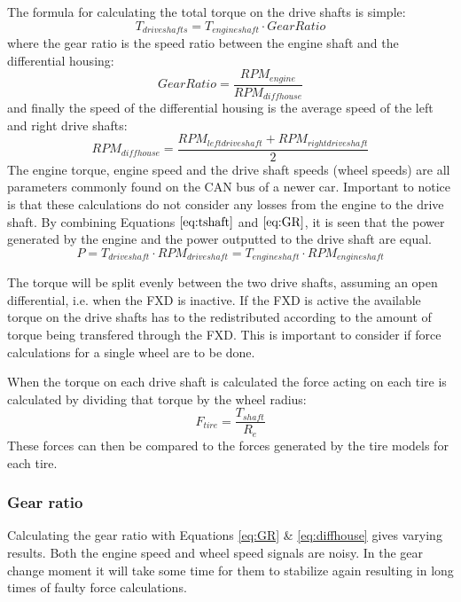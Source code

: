 The formula for calculating the total torque on the drive shafts is simple:
\begin{equation}
\label{eq:tshaft}
T_{driveshafts} = T_{engineshaft}\cdot GearRatio
\end{equation}
where the gear ratio is the speed ratio between the engine shaft and the differential housing:
\begin{equation}
\label{eq:GR}
Gear Ratio = \frac{RPM_{engine}}{RPM_{diffhouse}}
\end{equation}
and finally the speed of the differential housing is the average speed of the left and right drive shafts:
\begin{equation}
\label{eq:diffhouse}
RPM_{diffhouse} = \frac{RPM_{leftdriveshaft}+RPM_{rightdriveshaft}}{2}
\end{equation}
The engine torque, engine speed and the drive shaft speeds (wheel speeds) are all parameters commonly found on the CAN bus of a newer car. Important to notice is that these calculations do not consider any losses from the engine to the drive shaft. By combining Equations $ \ref{eq:tshaft} $ and $ \ref{eq:GR} $, it is seen that the power generated by the engine and the power outputted to the drive shaft are equal.
\begin{equation}
P = T_{driveshaft}\cdot RPM_{driveshaft} = T_{engineshaft}\cdot RPM_{engineshaft}
\end{equation}

The torque will be split evenly between the two drive shafts, assuming an open differential, i.e. when the FXD is inactive. If the FXD is active the available torque on the drive shafts has to the redistributed according to the amount of torque being transfered through the FXD. This is important to consider if force calculations for a single wheel are to be done. 

When the torque on each drive shaft is calculated the force acting on each tire is calculated by dividing that torque by the wheel radius:
\begin{equation}
\label{eq:tireforce}
F_{tire} = \frac{T_{shaft}}{R_{e}}
\end{equation}
These forces can then be compared to the forces generated by the tire models for each tire.

\subsubsection{Gear ratio}
Calculating the gear ratio with Equations \ref{eq:GR} \& \ref{eq:diffhouse} gives varying results. Both the engine speed and wheel speed signals are noisy. In the gear change moment it will take some time for them to stabilize again resulting in long times of faulty force calculations. 

